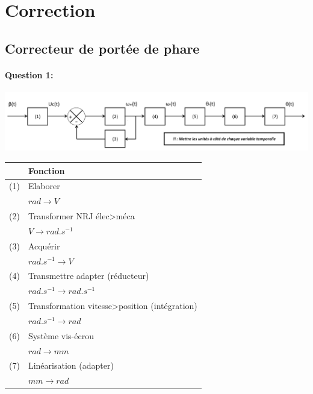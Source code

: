 \ifdef{\public}{}{}

\newpage
\cleardoublepage

\pagestyle{correction}

\section{Correction}

\subsection{Correcteur de portée de phare}

\paragraph{Question 1:}

\begin{center}
  \includegraphics[width=0.8\linewidth]{img/rep1}

\begin{tabular}{|c|m{10cm}|}
\hline
 & Fonction \\
\hline
 (1) & Elaborer \\
  ~\ & $rad \rightarrow V$ \\
\hline
 (2) & Transformer NRJ élec>méca\\
  ~\ & $V \rightarrow rad.s^{-1}$ \\
\hline
 (3) & Acquérir\\
  ~\ & $rad.s^{-1} \rightarrow V$ \\
\hline
 (4) & Transmettre adapter (réducteur)\\
  ~\ & $rad.s^{-1} \rightarrow rad.s^{-1}$ \\
\hline
 (5) & Transformation vitesse>position (intégration)\\
  ~\ & $rad.s^{-1} \rightarrow rad$ \\
\hline
 (6) & Système vis-écrou\\
  ~\ & $rad \rightarrow mm$ \\
\hline
 (7) & Linéarisation (adapter)\\
  ~\ & $mm \rightarrow rad$\\
\hline
\end{tabular}
\end{center}


